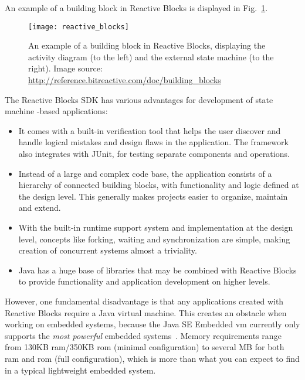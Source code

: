\noindent
An example of a building block in Reactive Blocks is displayed in Fig.~\ref{figure:reactive_blocks}.

\begin{figure}[htp]
	\centering
	\texttt{[image: reactive\_blocks]}
	\caption[A building block in Reactive Blocks]{An example of a building block in Reactive Blocks, displaying the activity diagram (to the left) and the external state machine (to the right). Image source: \url{http://reference.bitreactive.com/doc/building_blocks}}
	\label{figure:reactive_blocks}
\end{figure}

\noindent
The Reactive Blocks SDK has various advantages for development of state machine -based applications:

\begin{itemize}
	\item It comes with a built-in verification tool that helps the user discover and handle logical mistakes and design flaws in the application. The framework also integrates with JUnit, for testing separate components and operations.
	\item Instead of a large and complex code base, the application consists of a hierarchy of connected building blocks, with functionality and logic defined at the design level. This generally makes projects easier to organize, maintain and extend.
	\item With the built-in runtime support system and implementation at the design level, concepts like forking, waiting and synchronization are simple, making creation of concurrent systems almost a triviality.
	\item Java has a huge base of libraries that may be combined with Reactive Blocks to provide functionality and application development on higher levels.
\end{itemize}

\noindent
However, one fundamental disadvantage is that any applications created with Reactive Blocks require a Java virtual machine. This creates an obstacle when working on embedded systems, because the Java SE Embedded \gls{vm} currently only supports the \emph{most powerful} embedded systems~\cite{website:java_embedded_vm}. Memory requirements range from 130KB \gls{ram}/350KB \gls{rom} (minimal configuration) to several MB for both \gls{ram} and \gls{rom} (full configuration), which is more than what you can expect to find in a typical lightweight embedded system.

